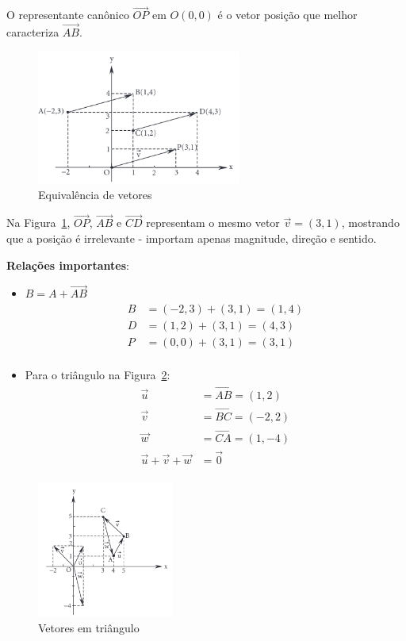 O representante canônico $\overrightarrow{OP}$ em $O(0,0)$ é o vetor posição que
melhor caracteriza $\overrightarrow{AB}$.

\begin{figure}[H]
  \centering
  \includegraphics[width=0.6\textwidth]{./fig/fig1.46.png}
  \caption{Equivalência de vetores}\label{fig:fig1.46}
\end{figure}

Na Figura~\ref{fig:fig1.46}, $\overrightarrow{OP}$, $\overrightarrow{AB}$ e
$\overrightarrow{CD}$ representam o mesmo vetor $\vec{v}=(3,1)$, mostrando que a
posição é irrelevante - importam apenas magnitude, direção e sentido.

\newpage
\textbf{Relações importantes}:
\begin{itemize}
  \item $B = A + \overrightarrow{AB}$
    \begin{align*}
      B &= (-2,3) + (3,1) = (1,4) \\
      D &= (1,2) + (3,1) = (4,3) \\
      P &= (0,0) + (3,1) = (3,1) \\
    \end{align*}

  \item Para o triângulo na Figura~\ref{fig:fig1.47}:
    \begin{align*}
      \vec{u} &= \overrightarrow{AB} = (1,2) \\
      \vec{v} &= \overrightarrow{BC} = (-2,2) \\
      \vec{w} &= \overrightarrow{CA} = (1,-4) \\
      \vec{u}+\vec{v}+\vec{w} &= \vec{0} \\
    \end{align*}
\end{itemize}

\begin{figure}[H]
  \centering
  \includegraphics[width=0.4\textwidth]{./fig/fig1.47.png}
  \caption{Vetores em triângulo}\label{fig:fig1.47}
\end{figure}

